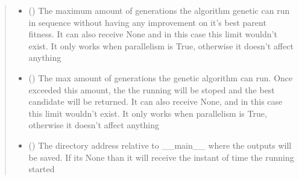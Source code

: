 \documentclass[letterpaper,10pt,english]{sphinxmanual}
\begin{document}
\begin{fulllineitems}
\begin{quote}
\begin{description}
\begin{itemize}
\item {} 
\sphinxAtStartPar
{} (\sphinxstyleliteralemphasis{\sphinxupquote{{[}}}\sphinxstyleliteralemphasis{\sphinxupquote{, }}\sphinxstyleliteralemphasis{\sphinxupquote{{]}}}) \textendash{} The maximum amount of generations the algorithm genetic can run in sequence without having
any improvement on it’s best parent fitness. It can also receive None and in this case this limit wouldn’t
exist. It only works when parallelism is True, otherwise it doesn’t affect anything

\item {} 
\sphinxAtStartPar
{} (\sphinxstyleliteralemphasis{\sphinxupquote{{[}}}\sphinxstyleliteralemphasis{\sphinxupquote{, }}\sphinxstyleliteralemphasis{\sphinxupquote{{]}}}) \textendash{} The max amount of generations the genetic algorithm can run. Once exceeded this amount, the
the running will be stoped and the best candidate will be returned. It can also receive None, and in this
case this limit wouldn’t exist. It only works when parallelism is True, otherwise it doesn’t affect anything

\item {} 
\sphinxAtStartPar
{} () \textendash{} The directory address relative to \_\_main\_\_ where the outputs will be saved. If its None
than it will receive the instant of time the running started

\end{itemize}

\end{description}\end{quote}


\end{fulllineitems}
\end{document}

